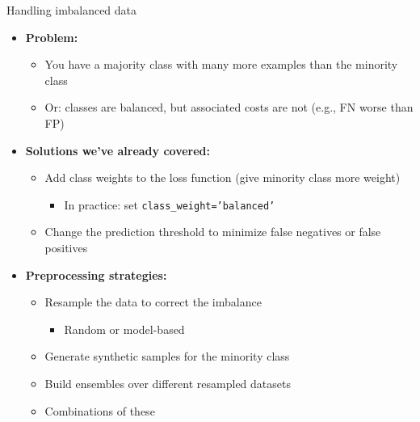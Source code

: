 \begin{frame}[allowframebreaks]{Handling imbalanced data}
\begin{itemize}
    \item \textbf{Problem:}
    \begin{itemize}
        \item You have a majority class with many more examples than the minority class
        \item Or: classes are balanced, but associated costs are not (e.g., FN worse than FP)
    \end{itemize}

    \item \textbf{Solutions we’ve already covered:}
    \begin{itemize}
        \item Add class weights to the loss function (give minority class more weight)
        \begin{itemize}
            \item In practice: set \texttt{class\_weight='balanced'}
        \end{itemize}
        \item Change the prediction threshold to minimize false negatives or false positives
    \end{itemize}

    \item \textbf{Preprocessing strategies:}
    \begin{itemize}
        \item Resample the data to correct the imbalance
        \begin{itemize}
            \item Random or model-based
        \end{itemize}
        \item Generate synthetic samples for the minority class
        \item Build ensembles over different resampled datasets
        \item Combinations of these
    \end{itemize}
\end{itemize}
\end{frame}

